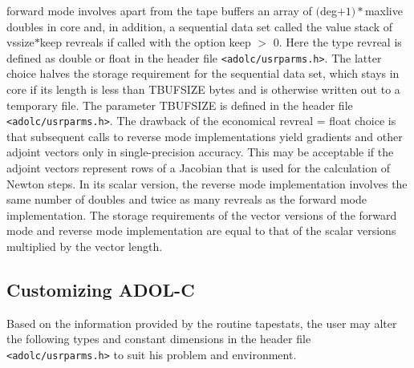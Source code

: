 \documentclass[11pt,twoside]{article}
\begin{document}
forward mode involves apart from the tape buffers an array of 
 $(${\sf deg}$+1)*${\sf maxlive} {\sf double}s in
core and, in addition, a sequential data set called the value stack 
of {\sf vssize}$*${\sf keep} {\sf revreal}s if called with the 
option {\sf keep} $>$ 0. Here
the type {\sf revreal} is defined as {\sf double} or {\sf float} in
the header file \verb=<adolc/usrparms.h>=. The latter choice halves the storage
requirement for the sequential data set, which stays in core if
its length is less than {\sf TBUFSIZE} bytes and is otherwise written
out to a temporary file. The parameter {\sf TBUFSIZE} is defined in the header file \verb=<adolc/usrparms.h>=.
The drawback of the economical 
{\sf revreal} = {\sf float} choice is that subsequent calls to reverse mode implementations
yield gradients and other adjoint vectors only in single-precision
accuracy. This may be acceptable if the adjoint vectors
represent rows of a Jacobian that is  used for the calculation of
Newton steps. In its scalar version, the reverse mode implementation involves 
the same number of {\sf double}s and twice as many {\sf revreal}s as the
forward mode implementation.
The storage requirements of the vector versions of the forward mode and
reverse mode implementation are equal to that of the scalar versions multiplied by
the vector length.
%
\subsection{Customizing ADOL-C}
\label{Customizing}
%
Based on the information provided by the routine {\sf tapestats}, the user may alter the
following types and constant dimensions in the header file \verb=<adolc/usrparms.h>=
to suit his problem and environment.
\end{document}
